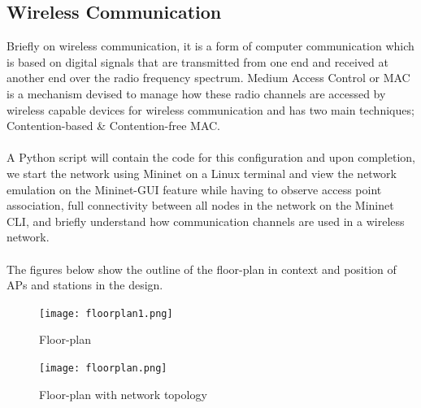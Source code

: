 \documentclass{article}
\begin{document}
\subsection{Wireless Communication}
Briefly on wireless communication, it is a form of computer communication which is based on digital signals that are transmitted from one end and received at another end over the radio frequency spectrum. Medium Access Control or MAC \citep{1010101} is a mechanism devised to manage how these radio channels are accessed by wireless capable devices for wireless communication and has two main techniques; Contention-based \& Contention-free MAC. \\\\
A Python script will contain the code for this configuration and upon completion, we start the network using Mininet on a Linux terminal and view the network emulation on the Mininet-GUI feature while having to observe access point association, full connectivity between all nodes in the network on the Mininet CLI, and briefly understand how communication channels are used in a wireless network. \\\\
The figures below show the outline of the floor-plan in context and position of APs and stations in the design.
    	\begin{figure}[h]
		\centering
        		\texttt{[image: floorplan1.png]}
        		\caption{Floor-plan}
        		\label{fig:t1-1}
        		\endminipage
        		\texttt{[image: floorplan.png]}
        		\caption{Floor-plan with network topology}
       		\label{fig:t1-2}
       		\endminipage
    	\end{figure} 
\end{document}
